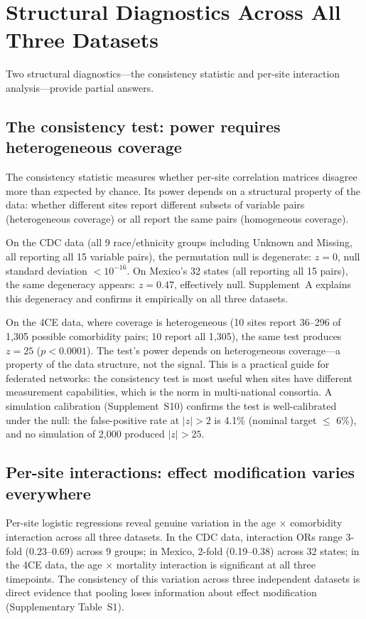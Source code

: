 \documentclass[11pt]{article}
\begin{document}
\section{Structural Diagnostics Across All Three Datasets}

Two structural diagnostics---the consistency statistic and per-site interaction
analysis---provide partial answers.

\subsection{The consistency test: power requires heterogeneous coverage}

The consistency statistic measures whether per-site correlation matrices
disagree more than expected by chance.  Its power depends on a structural
property of the data: whether different sites report different subsets of
variable pairs (heterogeneous coverage) or all report the same pairs
(homogeneous coverage).

On the CDC data (all 9 race/ethnicity groups including Unknown and
Missing, all reporting all 15 variable pairs), the
permutation null is degenerate: $z = 0$, null standard deviation
$< 10^{-16}$.  On Mexico's 32 states (all reporting all 15 pairs), the
same degeneracy appears: $z = 0.47$, effectively null.
Supplement~A explains this degeneracy and confirms it
empirically on all three datasets.

On the 4CE data, where coverage is heterogeneous (10 sites report
36--296 of 1,305 possible comorbidity pairs; 10 report all 1,305), the
same test produces $z = 25$ ($p < 0.0001$).  The test's power depends on
heterogeneous coverage---a property of the data structure, not the signal.
This is a practical guide for federated networks: the consistency test is
most useful when sites have different measurement capabilities,
which is the norm in multi-national consortia.  A simulation calibration
(Supplement~S10) confirms the test is well-calibrated under the null:
the false-positive rate at $|z| > 2$ is 4.1\% (nominal target
$\leq$ 6\%), and no simulation of 2{,}000 produced $|z| > 25$.


\subsection{Per-site interactions: effect modification varies everywhere}

Per-site logistic regressions reveal genuine variation in the
age $\times$ comorbidity interaction across all three datasets.  In the
CDC data, interaction ORs range 3-fold (0.23--0.69) across 9 groups; in
Mexico, 2-fold (0.19--0.38) across 32 states; in the 4CE data, the
age $\times$ mortality interaction is significant at all three timepoints.
The consistency of this variation across three independent datasets is
direct evidence that pooling loses information about effect modification
(Supplementary Table~S1).
\end{document}
